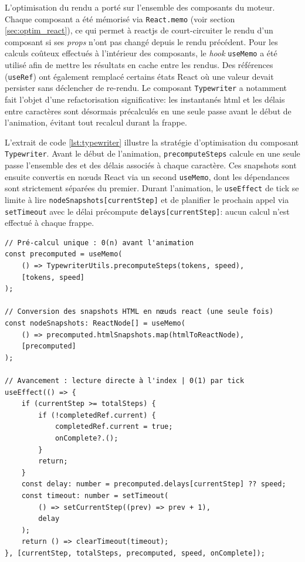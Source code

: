 
L'optimisation du rendu a porté sur l'ensemble des composants du moteur. Chaque composant a été mémorisé via \texttt{React.memo} (voir section \ref{sec:optim_react}), ce qui permet à \gls{reactjs} de court-circuiter le rendu d'un composant si ses \textit{props} n'ont pas changé depuis le rendu précédent. Pour les calculs coûteux effectués à l'intérieur des composants, le \textit{hook} \texttt{useMemo} a été utilisé afin de mettre les résultats en cache entre les rendus. Des références (\texttt{useRef}) ont également remplacé certains états React où une valeur devait persister sans déclencher de re-rendu. Le composant \texttt{Typewriter} a notamment fait l'objet d'une refactorisation significative: les instantanés \acrshort{html} et les délais entre caractères sont désormais précalculés en une seule passe avant le début de l'animation, évitant tout recalcul durant la frappe.

L'extrait de code \ref{lst:typewriter} illustre la stratégie d'optimisation du composant \texttt{Typewriter}. Avant le début de l'animation, \texttt{precomputeSteps} calcule en une seule passe l'ensemble des  et des délais associés à chaque caractère. Ces snapshots sont ensuite convertis en n\oe{}uds React via un second \texttt{useMemo}, dont les dépendances sont strictement séparées du premier. Durant l'animation, le \texttt{useEffect} de tick se limite à lire \texttt{nodeSnapshots[currentStep]} et de planifier le prochain appel via \texttt{setTimeout} avec le délai précompute \texttt{delays[currentStep]}: aucun calcul n'est effectué à chaque frappe. 

\begin{listing}[H]
\begin{verbatim}
// Pré-calcul unique : 0(n) avant l'animation
const precomputed = useMemo(
    () => TypewriterUtils.precomputeSteps(tokens, speed),
    [tokens, speed]
);

// Conversion des snapshots HTML en nœuds react (une seule fois)
const nodeSnapshots: ReactNode[] = useMemo(
    () => precomputed.htmlSnapshots.map(htmlToReactNode),
    [precomputed]
);

// Avancement : lecture directe à l'index | 0(1) par tick
useEffect(() => {
    if (currentStep >= totalSteps) {
        if (!completedRef.current) {
            completedRef.current = true;
            onComplete?.();
        }
        return;
    }
    const delay: number = precomputed.delays[currentStep] ?? speed;
    const timeout: number = setTimeout(
        () => setCurrentStep((prev) => prev + 1),
        delay
    );
    return () => clearTimeout(timeout);
}, [currentStep, totalSteps, precomputed, speed, onComplete]);
\end{verbatim}
\caption{Précomputation des instantanés HTML et des délais dans le composant \textit{Typewriter} (Auteur 2026)}
\label{lst:typewriter}
\end{listing}

